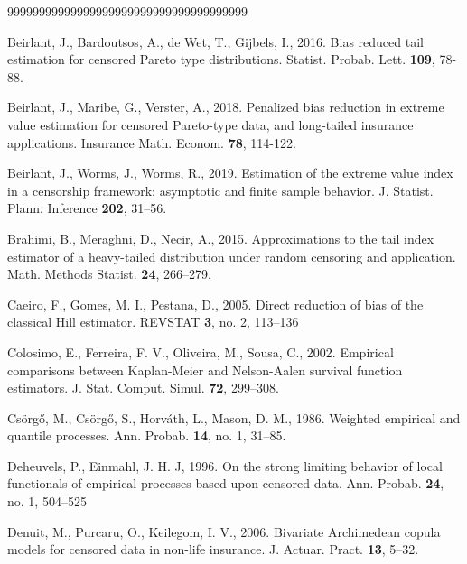 \documentclass[reqno,openbib,runningheads,a4paper,12pt]{amsart}%
\begin{document}
\begin{thebibliography}{99999999999999999999999999999999999999}                                                           %


Beirlant, J., Bardoutsos,
A., de Wet, T., Gijbels, I., 2016. Bias reduced tail estimation for censored
Pareto type distributions. Statist. Probab. Lett. \textbf{109}, 78-88.

Beirlant, J., Maribe, G.,
Verster, A., 2018. Penalized bias reduction in extreme value estimation for
censored Pareto-type data, and long-tailed insurance applications. Insurance
Math. Econom. \textbf{78}, 114-122.

Beirlant, J., Worms, J.,
Worms, R., 2019. Estimation of the extreme value index in a censorship
framework: asymptotic and finite sample behavior. J. Statist. Plann. Inference
\textbf{202}, 31--56.

Brahimi, B.,
Meraghni, D., Necir, A., 2015. Approximations to the tail index estimator of a
heavy-tailed distribution under random censoring and application. Math.
Methods Statist. \textbf{24}, 266--279.

Caeiro, F., Gomes, M. I.,
Pestana, D., 2005. Direct reduction of bias of the classical Hill estimator.
REVSTAT \textbf{3}, no. 2, 113--136

Colosimo, E., Ferreira,
F. V., Oliveira, M., Sousa, C., 2002. Empirical comparisons between
Kaplan-Meier and Nelson-Aalen survival function estimators. J. Stat. Comput.
Simul. \textbf{72}, 299--308.

Cs\"{o}rg\H{o}, M.,
Cs\"{o}rg\H{o}, S., Horv\'{a}th, L., Mason, D. M., 1986. Weighted empirical
and quantile processes. Ann. Probab. \textbf{14}, no. 1, 31--85.

Deheuvels, P., Einmahl, J.
H. J, 1996. On the strong limiting behavior of local functionals of empirical
processes based upon censored data. Ann. Probab. \textbf{24}, no. 1, 504--525

Denuit, M., Purcaru, O.,
Keilegom, I. V., 2006. Bivariate Archimedean copula models for censored data
in non-life insurance. J. Actuar. Pract. \textbf{13}, 5--32.


\end{thebibliography}
\end{document}
